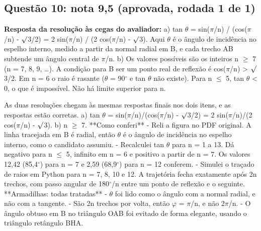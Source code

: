 \documentclass{article}%
\begin{document}
\subsection*{Questão 10: nota 9,5 (aprovada, rodada 1 de 1)}%
\textbf{Resposta da resolução às cegas do avaliador:} a) tan $\theta$ = sin($\pi$/n) / (cos($\pi$/n) - $\surd$3/2) = 2 sin($\pi$/n) / (2 cos($\pi$/n) - $\surd$3). Aqui $\theta$ é o ângulo de incidência no espelho interno, medido a partir da normal radial em B, e cada trecho AB subtende um ângulo central de $\pi$/n.\newline%
\newline%
b) Os valores possíveis são os inteiros n $\geq$ 7 (n = 7, 8, 9, \ldots{}). A condição para B ser um ponto real de reflexão é cos($\pi$/n) > $\surd$3/2. Em n = 6 o raio é rasante ($\theta$ = 90$^\circ$ e tan $\theta$ não existe). Para n $\leq$ 5, tan $\theta$ < 0, o que é impossível. Não há limite superior para n.\par %
As duas resoluções chegam às mesmas respostas finais nos dois itens, e as respostas estão corretas.\newline%
a) tan $\theta$ = sin($\pi$/n)/(cos($\pi$/n) - $\surd$3/2) = 2 sin($\pi$/n)/(2 cos($\pi$/n) - $\surd$3).\newline%
b) n $\geq$ 7.\newline%
\newline%
**Como conferi**\newline%
{-} Reli a figura no PDF original. A linha tracejada em B é radial, então $\theta$ é o ângulo de incidência no espelho interno, como o candidato assumiu.\newline%
{-} Recalculei tan $\theta$ para n = 1 a 13. Dá negativo para n $\leq$ 5, infinito em n = 6 e positivo a partir de n = 7. Os valores 12,42 (85,4$^\circ$) para n = 7 e 2,59 (68,9$^\circ$) para n = 12 conferem.\newline%
{-} Simulei o traçado de raios em Python para n = 7, 8, 10 e 12. A trajetória fecha exatamente após 2n trechos, com passo angular de 180$^\circ$/n entre um ponto de reflexão e o seguinte.\newline%
\newline%
**Armadilhas: todas tratadas**\newline%
{-} $\theta$ foi lido como o ângulo com a normal radial, e não com a tangente.\newline%
{-} São 2n trechos por volta, então $\varphi$ = $\pi$/n, e não 2$\pi$/n.\newline%
{-} O ângulo obtuso em B no triângulo OAB foi evitado de forma elegante, usando o triângulo retângulo BHA.\newline%
\end{document}
